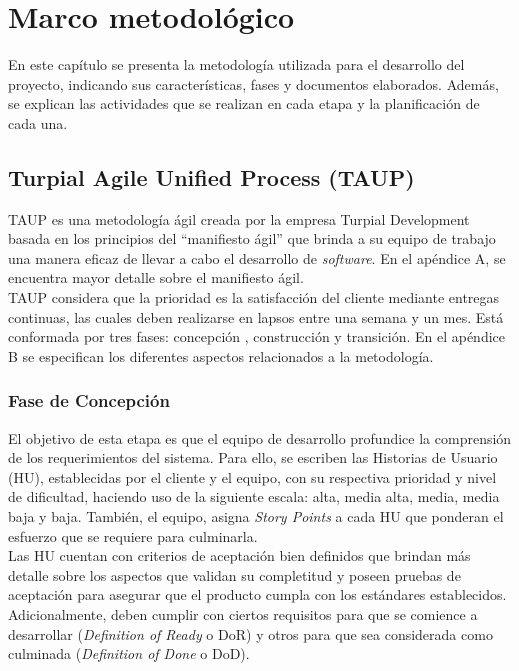 \chapter{\textbf{Marco metodológico}}

\thispagestyle{empty}

En este capítulo se presenta la metodología utilizada para el desarrollo del proyecto, indicando sus características, fases y documentos elaborados. Además, se explican las actividades que se realizan en cada etapa y la planificación de cada una.

\section{Turpial Agile Unified Process (TAUP)}

TAUP es una metodología ágil creada por la empresa Turpial Development basada en los principios del “manifiesto ágil” que brinda a su equipo de trabajo una manera eficaz de llevar a cabo el desarrollo de \textit{software}. En el apéndice A, se encuentra mayor detalle sobre el manifiesto ágil. \\

TAUP considera que la prioridad es la satisfacción del cliente mediante entregas continuas, las cuales deben realizarse en lapsos entre una semana y un mes. Está conformada por tres fases: concepción , construcción y transición. En el apéndice B se especifican los diferentes aspectos relacionados a la metodología.

\subsection{Fase de Concepción}

El objetivo de esta etapa es que el equipo de desarrollo profundice la comprensión de los requerimientos del sistema. Para ello, se escriben las Historias de Usuario (HU), establecidas por el cliente y el equipo, con su respectiva prioridad y nivel de dificultad, haciendo uso de la siguiente escala: alta, media alta, media, media baja y baja. También, el equipo, asigna \textit{Story Points} a cada HU que ponderan el esfuerzo que se requiere para culminarla.\\

Las HU cuentan con criterios de aceptación bien definidos que brindan más detalle sobre los aspectos que validan su completitud y poseen pruebas de aceptación para asegurar que el producto cumpla con los estándares establecidos. Adicionalmente, deben cumplir con ciertos requisitos para que se comience a desarrollar (\textit{Definition of Ready} o DoR) y otros para que sea considerada como culminada (\textit{Definition of Done} o DoD).\\

